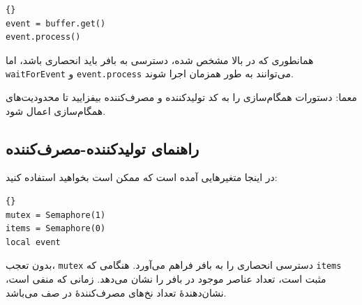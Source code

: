 \documentclass{book}
\newcommand{\clearemptydoublepage}{\newpage\cleardoublepage}
\begin{document}
\begin{latin}
\begin{latin}
\begin{lstlisting}[title=\rl{کد پایه مصرف‌کننده}]{}
event = buffer.get()
event.process()
\end{lstlisting}
\end{latin}
\end{latin}

    همانطوری که در بالا مشخص شده، دسترسی به بافر باید انحصاری باشد، 
    اما {\tt waitForEvent} و {\tt event.process} می‌توانند به طور همزمان اجرا شوند.
    

    معما: دستورات همگام‌سازی را به کد تولید‌کننده و مصرف‌کننده بیفزایید تا محدودیت‌های همگام‌سازی اعمال شود.

\clearemptydoublepage
\subsection{راهنمای تولیدکننده-مصرف‌کننده}

    در اینجا متغیرهایی آمده است که ممکن است بخواهید استفاده کنید:

\begin{latin}
\begin{latin}
\begin{lstlisting}[title=\rl{مقداردهی اولیه تولیدکننده-مصرف‌کننده}]{}
mutex = Semaphore(1)
items = Semaphore(0)
local event
\end{lstlisting}
\end{latin}
\end{latin}


    بدون تعجب، {\tt mutex} دسترسی انحصاری را به بافر فراهم می‌آورد. 
    هنگامی که {\tt items} مثبت است، تعداد عناصر موجود در بافر را نشان می‌دهد. 
    زمانی که منفی است، نشان‌دهندهٔ تعداد نخ‌های مصرف‌کنندهٔ در صف می‌باشد. 
\end{document}
